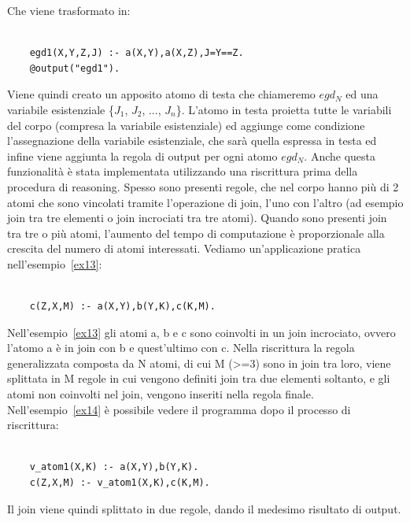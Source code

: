 Che viene trasformato in: 
\begin{example}\label{ex18}
	\begin{lstlisting}
	
	egd1(X,Y,Z,J) :- a(X,Y),a(X,Z),J=Y==Z.
	@output("egd1").
	\end{lstlisting}
\end{example}
Viene quindi creato un apposito atomo di testa che chiameremo \emph{$egd_{N}$} ed una variabile esistenziale \{$J_{1}$, $J_{2}$, ..., $J_{n}$\}. L'atomo in testa proietta tutte le variabili del corpo (compresa la variabile esistenziale) ed aggiunge come condizione l'assegnazione della variabile esistenziale, che sarà quella espressa in testa ed infine viene aggiunta la regola di output per ogni atomo $egd_{N}$. Anche questa funzionalità è stata implementata utilizzando una riscrittura prima della procedura di reasoning. \newline \newline
Spesso sono presenti regole, che nel corpo hanno più di 2 atomi che sono vincolati tramite l'operazione di join, l'uno con l'altro (ad esempio join tra tre elementi o join incrociati tra tre atomi). \newline
Quando sono presenti join tra tre o più atomi, l'aumento del tempo di computazione è proporzionale alla crescita del numero di atomi interessati. Vediamo un'applicazione pratica nell'esempio~\ref{ex13}:
\begin{example}\label{ex13}
	\begin{lstlisting}
	
	c(Z,X,M) :- a(X,Y),b(Y,K),c(K,M).
	\end{lstlisting}
\end{example}
Nell'esempio~\ref{ex13} gli atomi a, b e c sono coinvolti in un join incrociato, ovvero l'atomo a è in join con b e quest'ultimo con c. \newline
Nella riscrittura la regola generalizzata composta da N atomi, di cui M (>=3) sono in join tra loro, viene splittata in M regole in cui vengono definiti join tra due elementi soltanto, e gli atomi non coinvolti nel join, vengono inseriti nella regola finale. \newline
Nell'esempio~\ref{ex14} è possibile vedere il programma dopo il processo di riscrittura: 
\begin{example}\label{ex14}
	\begin{lstlisting}
	
	v_atom1(X,K) :- a(X,Y),b(Y,K). 
	c(Z,X,M) :- v_atom1(X,K),c(K,M).
	\end{lstlisting}
\end{example}
Il join viene quindi splittato in due regole, dando il medesimo risultato di output.

